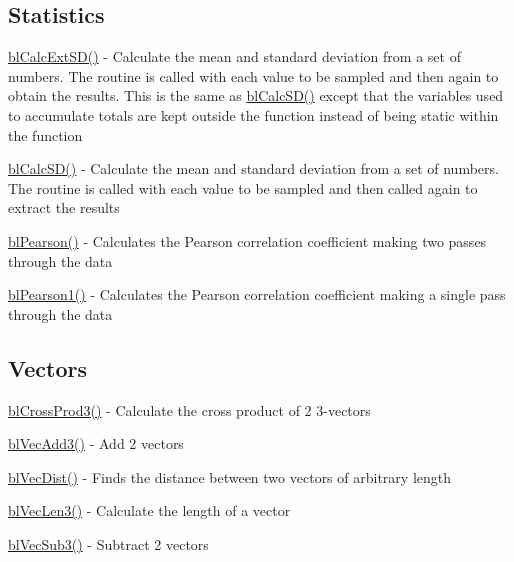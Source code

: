 \subsection*{Statistics }


\begin{DoxyItemize}
\item \hyperlink{_calc_ext_s_d_8c_a0ce11017b526a387632280d0d7bb8930}{bl\-Calc\-Ext\-S\-D()} -\/ Calculate the mean and standard deviation from a set of numbers. The routine is called with each value to be sampled and then again to obtain the results. This is the same as \hyperlink{_calc_s_d_8c_a6be832c4999268c59458a08373d1b144}{bl\-Calc\-S\-D()} except that the variables used to accumulate totals are kept outside the function instead of being static within the function
\item \hyperlink{_calc_s_d_8c_a6be832c4999268c59458a08373d1b144}{bl\-Calc\-S\-D()} -\/ Calculate the mean and standard deviation from a set of numbers. The routine is called with each value to be sampled and then called again to extract the results
\item \hyperlink{_math_util_8h_a950d087bd130c8270ec1960f8d1c361e}{bl\-Pearson()} -\/ Calculates the Pearson correlation coefficient making two passes through the data
\item \hyperlink{_math_util_8h_a43c7573134f708e799ef237f15eb5614}{bl\-Pearson1()} -\/ Calculates the Pearson correlation coefficient making a single pass through the data
\end{DoxyItemize}

\subsection*{Vectors }


\begin{DoxyItemize}
\item \hyperlink{_cross_prod3_8c_ae030a8e5551b2a1ffd5bbc9f7456ac40}{bl\-Cross\-Prod3()} -\/ Calculate the cross product of 2 3-\/vectors
\item \hyperlink{_math_util_8h_adefb6a6e11a7bb36ddc6479ce93667db}{bl\-Vec\-Add3()} -\/ Add 2 vectors
\item \hyperlink{matrix_8h_ae6f8645556041bca6707f172ecb2c4cc}{bl\-Vec\-Dist()} -\/ Finds the distance between two vectors of arbitrary length
\item \hyperlink{_math_util_8h_a7f5b432d8567a25ff5da2b6aae162cc7}{bl\-Vec\-Len3()} -\/ Calculate the length of a vector
\item \hyperlink{_math_util_8h_ab122c0a7de95289d60f96dc717580010}{bl\-Vec\-Sub3()} -\/ Subtract 2 vectors 
\end{DoxyItemize}